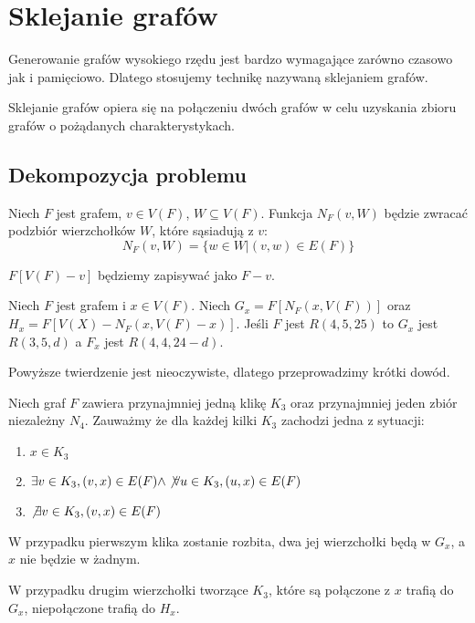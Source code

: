 \chapter{Sklejanie grafów}

Generowanie grafów wysokiego rzędu jest bardzo wymagające zarówno czasowo jak i pamięciowo. Dlatego stosujemy technikę nazywaną sklejaniem grafów. 
\begin{definition}
Sklejanie grafów opiera się na połączeniu dwóch grafów w celu uzyskania zbioru grafów o pożądanych charakterystykach.
\end{definition}
\section{Dekompozycja problemu}
\begin{definition}
  Niech $F$ jest grafem, $v \in V(F)$, $W \subseteq V(F)$. 
  Funkcja $N_F(v,W)$ będzie zwracać podzbiór wierzchołków $W$, które sąsiadują z $v$: 
  $$N_F(v,W) = \{w \in W | (v,w) \in E(F)\}$$ 
\end{definition}

\begin{definition}
  $F[V(F) - {v}]$ będziemy zapisywać jako $F - v$.
\end{definition}

\begin{theorem}
  Niech $F$ jest grafem i $x \in V(F)$. Niech $G_x = F[N_F(x,V(F))]$
  oraz $H_x = F[V(X) - N_F(x,V(F) - x)]$. Jeśli $F$ jest $R(4,5,25)$ to 
  $G_x$ jest $R(3,5,d)$ a $F_x$ jest $R(4,4,24-d)$.
\end{theorem}


Powyższe twierdzenie jest nieoczywiste, dlatego przeprowadzimy krótki dowód. 


  Niech graf $F$ zawiera przynajmniej jedną klikę $K_3$ oraz przynajmniej jeden zbiór niezależny $N_4$.
  Zauważmy że dla każdej kilki $K_3$ zachodzi jedna z sytuacji:
  \begin{enumerate}
    \item $x \in K_3$
    \item $ \exists v \in K_3, (v, x) \in E(F) \land \not \forall u \in K_3, (u,x) \in E(F)$ 
    \item $\not \exists v \in K_3, (v, x) \in E(F)$
  \end{enumerate} 
  
  W przypadku pierwszym klika zostanie rozbita, dwa jej wierzchołki będą w $G_x$, a $x$ nie będzie w żadnym.
  
  W przypadku drugim wierzchołki tworzące $K_3$, które są połączone z $x$ trafią do $G_x$, niepołączone trafią do $H_x$.
  
